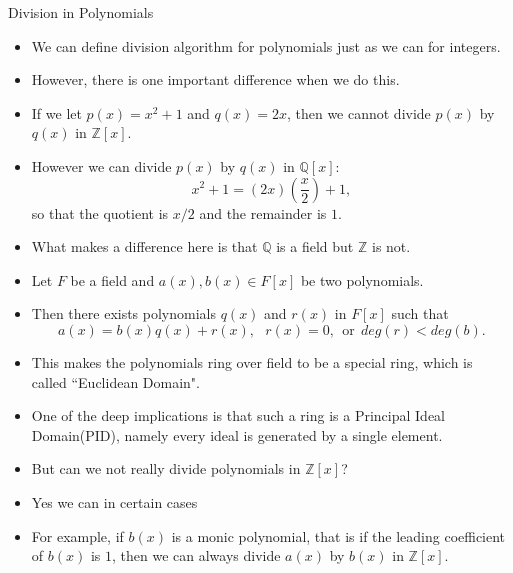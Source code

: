 \documentclass[ %
 10pt, xcolor={dvipsnames,svgnames,x11names,hyperref},
   hyperref={colorlinks=true,citecolor=green,linkcolor=DarkRed,urlcolor=ProcessBlue,anchorcolor=blue}
  ]{beamer}
\newenvironment{stepitemize}{\begin{itemize}[<+->]}{\end{itemize} }
\newcommand{\Z}{\mathbb{Z}}
\newcommand{\Q}{\mathbb{Q}}
\begin{document}
\begin{frame}{Division in Polynomials}
\begin{stepitemize}
\item We can define division algorithm for polynomials just as we can for integers.
\item However, there is one important difference when we do this.
\item
If we let $p(x)=x^2+1$ and $q(x)=2x$, then we cannot divide $p(x)$ by $q(x)$ in $\Z[x]$.
\item However we can divide $p(x)$ by $q(x)$ in $\Q[x]$:
$$x^2+1 = (2x)(\frac{x}{2})+1,$$ so that the quotient is $x/2$ and the remainder is $1$.
\item What makes a difference here is that $\Q$ is a field but $\Z$ is not.
\end{stepitemize}
\end{frame}

\begin{frame}{}
\begin{stepitemize}
\item Let $F$ be a field and $a(x), b(x) \in F[x]$ be two polynomials.
\item Then there exists polynomials $q(x)$ and $r(x)$ in $F[x]$ such that
$$a(x) = b(x)q(x)+r(x), \:\:\: r(x)=0, \:\:\textrm{or}\:\: deg(r)<deg(b).$$
\item This makes the polynomials ring over field to be a special ring, which is called ``Euclidean Domain".
\item One of the deep implications is that such a ring is a Principal Ideal Domain(PID), namely every ideal is generated by a single element.
\item But can we not really divide polynomials in $\Z[x]$?
\item Yes we can in certain cases
\item For example, if $b(x)$ is a monic polynomial, that is if the leading coefficient of $b(x)$ is $1$, then we can always divide $a(x)$ by $b(x)$ in $\Z[x]$.
\end{stepitemize}
\end{frame}
\end{document}

